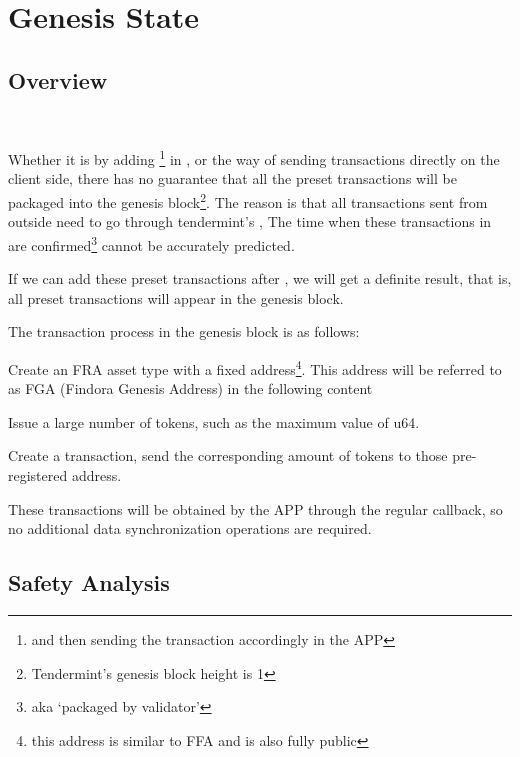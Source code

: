 \clearpage

\section{Genesis State}

\subsection{Overview}

~\par

Whether it is by adding \footnote{and then sending the transaction accordingly in the APP}
in ,
or the way of sending transactions directly on the client side, there has no guarantee that all the preset
transactions will be packaged into the genesis block\footnote{Tendermint's genesis block height is 1}.
The reason is that all transactions sent from outside need to go through tendermint's ,
The time when these transactions in  are confirmed\footnote{aka `packaged by validator'} cannot be accurately predicted.

If we can add these preset transactions after , we will get a definite result,
that is, all preset transactions will appear in the genesis block.

The transaction process in the genesis block is as follows:

\begin{ENUMERATE}
    \item Create an FRA asset type with a fixed address\footnote {this address is similar to FFA and is also fully public}.
            This address will be referred to as FGA (Findora Genesis Address) in the following content
    \item Issue a large number of tokens, such as the maximum value of u64.
    \item Create a transaction, send the corresponding amount of tokens to those pre-registered address.
    \item These transactions will be obtained by the APP through the regular
             callback, so no additional data synchronization operations are required.
\end{ENUMERATE}

\subsection{Safety Analysis}

